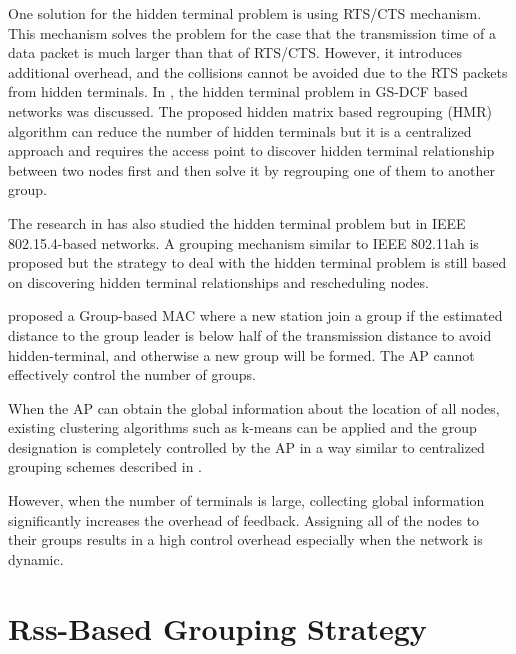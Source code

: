 One solution for the hidden terminal problem is using RTS/CTS mechanism. This mechanism solves the problem for the case that the transmission time of a data packet is much larger than that of RTS/CTS. However, it introduces additional overhead, and the collisions cannot be avoided due to the RTS packets from hidden terminals. In \cite{yoonregrouping}, the hidden terminal problem in GS-DCF based networks was discussed. The proposed hidden matrix based regrouping (HMR) algorithm can reduce the number of hidden terminals but it is a centralized approach and requires the access point to discover hidden terminal relationship between two nodes first and then solve it by regrouping one of them to another group.

The research in \cite{tseng2014effective} has also studied the hidden terminal problem but in IEEE 802.15.4-based networks. A grouping mechanism similar to IEEE 802.11ah is proposed but the strategy to deal with the hidden terminal problem is still based on discovering hidden terminal relationships and rescheduling nodes.

\cite{abichar2013group} proposed a Group-based MAC where a new station join a group if the estimated distance to the group leader is below half of the transmission distance to avoid hidden-terminal, and otherwise a new group will be formed. The AP cannot effectively control the number of groups.

When the AP can obtain the global information about the location of all nodes, existing clustering algorithms such as k-means can be applied and the group designation is completely controlled by the AP in a way similar to centralized grouping schemes described in \cite{zheng2014performance}.

However, when the number of terminals is large, collecting global information significantly increases the overhead of feedback. Assigning all of the nodes to their groups results in a high control overhead especially when the network is dynamic.

\section{Rss-Based Grouping Strategy}

